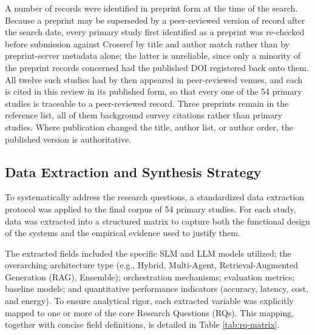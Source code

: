 A number of records were identified in preprint form at the time of the search. Because a preprint may be superseded by a peer-reviewed version of record after the search date, every primary study first identified as a preprint was re-checked before submission against Crossref by title and author match rather than by preprint-server metadata alone; the latter is unreliable, since only a minority of the preprint records concerned had the published DOI registered back onto them. All twelve such studies had by then appeared in peer-reviewed venues, and each is cited in this review in its published form, so that every one of the 54 primary studies is traceable to a peer-reviewed record. Three preprints remain in the reference list, all of them background survey citations rather than primary studies. Where publication changed the title, author list, or author order, the published version is authoritative.

\subsection{Data Extraction and Synthesis Strategy}
\label{sec:data_extraction}

To systematically address the research questions, a standardized data extraction protocol was applied to the final corpus of 54 primary studies. For each study, data was extracted into a structured matrix to capture both the functional design of the systems and the empirical evidence used to justify them. 

The extracted fields included the specific SLM and LLM models utilized; the overarching architecture type (e.g., Hybrid, Multi-Agent, Retrieval-Augmented Generation (RAG), Ensemble); orchestration mechanisms; evaluation metrics; baseline models; and quantitative performance indicators (accuracy, latency, cost, and energy). To ensure analytical rigor, each extracted variable was explicitly mapped to one or more of the core Research Questions (RQs). This mapping, together with concise field definitions, is detailed in Table \ref{tab:rq-matrix}.

